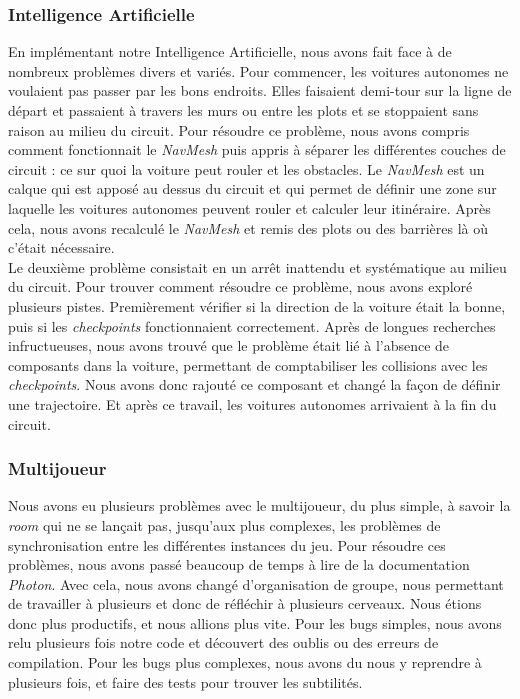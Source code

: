\documentclass[a4paper,12pt]{article}
\newcommand{\AI}{Intelligence Artificielle}
\begin{document}
            \subsubsection{\AI}
                En implémentant notre \AI, nous avons fait face à de nombreux problèmes divers et variés. Pour 
                commencer, les voitures autonomes ne voulaient pas passer par les bons endroits. Elles 
                faisaient demi-tour sur la ligne de départ et passaient à travers les murs ou entre les 
                plots et se stoppaient sans raison au milieu du circuit. Pour résoudre ce problème, nous
                avons compris comment fonctionnait le \textit{NavMesh} puis appris à séparer les 
                différentes couches de circuit : ce sur quoi la voiture peut rouler et les obstacles. Le 
                \textit{NavMesh} est un calque qui est apposé au dessus du circuit et qui permet de
                définir une zone sur laquelle les voitures autonomes peuvent rouler et calculer leur
                itinéraire. Après cela, nous avons recalculé le \textit{NavMesh} et remis des plots
                ou des barrières là où c'était nécessaire.\\
                Le deuxième problème consistait en un arrêt inattendu et systématique au milieu du 
                circuit. Pour trouver comment résoudre ce problème, nous avons exploré plusieurs pistes. Premièrement vérifier si la direction de la voiture était la bonne, puis si les 
                \textit{checkpoints} fonctionnaient correctement. Après de longues recherches 
                infructueuses, nous avons trouvé que le problème était lié à l'absence de composants 
                dans la voiture, permettant de comptabiliser les collisions avec les 
                \textit{checkpoints}. Nous avons donc rajouté ce composant et changé la façon de définir
                une trajectoire. Et après ce travail, les voitures autonomes arrivaient à la fin du 
                circuit.

            \subsubsection{Multijoueur}
                Nous avons eu plusieurs problèmes avec le multijoueur, du plus simple, à savoir la \textsl{room} qui ne se lançait pas, jusqu'aux plus complexes, les problèmes de synchronisation entre les différentes instances du jeu. Pour résoudre ces problèmes, nous avons passé beaucoup de temps à lire de la documentation \textsl{Photon}.
                Avec cela, nous avons changé d'organisation de groupe, nous permettant de travailler à plusieurs et donc de réfléchir à plusieurs cerveaux. Nous étions donc plus productifs, et nous allions plus vite. Pour les bugs simples, nous avons relu plusieurs fois notre code et découvert des oublis ou des erreurs de compilation.
                Pour les bugs plus complexes, nous avons du nous y reprendre à plusieurs fois, et faire des tests pour trouver les subtilités.
    
\end{document}
